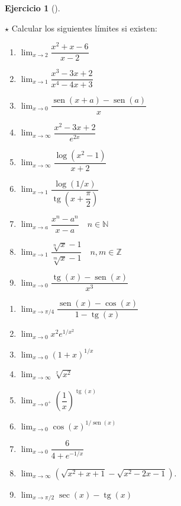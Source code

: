 \documentclass[
  a4paper,
]{scrreport}
\theoremstyle{definition}
\newtheorem{exercise}{Ejercicio}[chapter]
\theoremstyle{remark}
\begin{document}
\begin{exercise}[]\protect\hypertarget{exr-limites-1}{}\label{exr-limites-1}

\(\star\) Calcular los siguientes límites si existen:

\begin{enumerate}
\def\labelenumi{\alph{enumi}.}
\item
  \(\displaystyle \lim_{x\to 2} \dfrac{x^2+x-6}{x-2}\)
\item
  \(\displaystyle \lim_{x\to 1}\dfrac{x^3-3x+2}{x^4-4x+3}\)
\item
  \(\displaystyle \lim_{x\to 0}\dfrac{\operatorname{sen}(x+a)-\operatorname{sen}(a)}{x}\)
\item
  \(\displaystyle \lim_{x\to\infty}\dfrac{x^2-3x+2}{e^{2x}}\)
\item
  \(\displaystyle \lim_{x\to\infty}\dfrac{\log(x^2-1)}{x+2}\)
\item
  \(\displaystyle \lim_{x\to 1}\dfrac{\log(1/x)}{\operatorname{tg}(x+\dfrac{\pi}{2})}\)
\item
  \(\displaystyle \lim_{x\to a}\dfrac{x^n-a^n}{x-a}\quad n\in \mathbb{N}\)
\item
  \(\displaystyle \lim_{x\to 1}\dfrac{\sqrt[n]{x}-1}{\sqrt[m]{x}-1} \quad n,m \in \mathbb{Z}\)
\item
  \(\displaystyle \lim_{x\to 0}\dfrac{\operatorname{tg}(x)-\operatorname{sen}(x)}{x^3}\)
\end{enumerate}

\begin{enumerate}
\def\labelenumi{\alph{enumi}.}
\setcounter{enumi}{9}
\item
  \(\displaystyle \lim_{x\to \pi/4}\dfrac{\operatorname{sen}(x)-\cos(x)}{1-\operatorname{tg}(x)}\)
\item
  \(\displaystyle \lim_{x\to 0}x^2e^{1/x^2}\)
\item
  \(\displaystyle \lim_{x\to 0}\left(1+x\right)^{1/x}\)
\item
  \(\displaystyle \lim_{x\to \infty} \sqrt[x]{x^2}\)
\item
  \(\displaystyle \lim_{x\to 0^+}\left(\dfrac{1}{x}\right)^{\operatorname{tg}(x)}\)
\item
  \(\displaystyle \lim_{x\to 0}\cos(x)^{1/\operatorname{sen}(x)}\)
\item
  \(\displaystyle \lim_{x\to 0}\dfrac{6}{4+e^{-1/x}}\)
\item
  \(\displaystyle \lim_{x\to \infty}\left(\sqrt{x^2+x+1}-\sqrt{x^2-2x-1}\right)\).
\item
  \(\displaystyle \lim_{x\to \pi/2}\sec(x)-\operatorname{tg}(x)\)
\end{enumerate}

\end{exercise}
\end{document}
